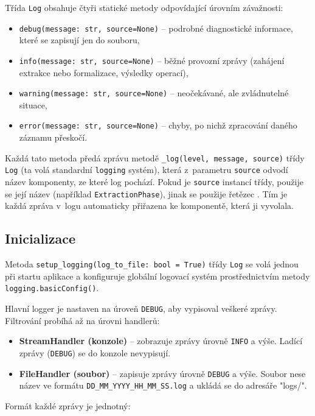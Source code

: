 \documentclass[czech, bc, kiv, he, iso690numb, pdf]{fasthesis}
\begin{document}
Třída \texttt{Log} obsahuje čtyři statické metody odpovídající úrovním závažnosti:

\begin{itemize}
    \item \texttt{debug(message: str, source=None)} -- podrobné diagnostické informace, které se zapisují jen do souboru,
    \item \texttt{info(message: str, source=None)} -- běžné provozní zprávy (zahájení extrakce nebo formalizace, výsledky operací),
    \item \texttt{warning(message: str, source=None)} -- neočekávané, ale zvládnutelné situace,
    \item \texttt{error(message: str, source=None)} -- chyby, po nichž zpracování daného záznamu přeskočí.
\end{itemize}

Každá tato metoda předá zprávu metodě \verb"_log(level, message, source)" třídy \verb"Log" (ta volá standardní \verb"logging" systém), která z~parametru \texttt{source} odvodí název komponenty, ze které log pochází. Pokud je \texttt{source} instancí třídy, použije se její název (například \texttt{ExtractionPhase}), jinak se použije řetězec . Tím je každá zpráva v~logu automaticky přiřazena ke komponentě, která ji vyvolala.


\subsection{Inicializace}
Metoda \verb"setup_logging(log_to_file: bool = True)" třídy \verb"Log" se volá jednou při startu aplikace a konfiguruje globální logovací systém prostřednictvím metody \texttt{logging.basicConfig()}.

Hlavní logger je nastaven na úroveň \texttt{DEBUG}, aby vypisoval veškeré zprávy. Filtrování probíhá až na úrovni handlerů:

\begin{itemize}
    \item \textbf{StreamHandler (konzole)} -- zobrazuje zprávy úrovně \texttt{INFO} a výše. Ladící zprávy (\texttt{DEBUG}) se do konzole nevypisují.
    \item \textbf{FileHandler (soubor)} -- zapisuje zprávy úrovně \texttt{DEBUG} a výše. Soubor nese název ve formátu \verb"DD_MM_YYYY_HH_MM_SS.log" a ukládá se do adresáře \filename"logs/".
\end{itemize}

Formát každé zprávy je jednotný:
\end{document}
